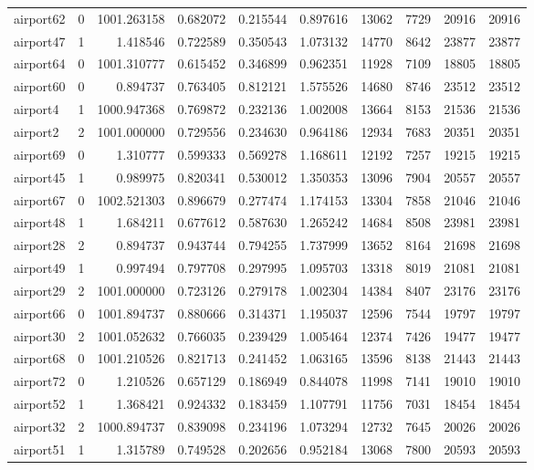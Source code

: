 \begin{longtable}{|l|r|r|r|r|r|r|r|r|r|}
airport62 & 0 & 1001.263158 & 0.682072 & 0.215544 & 0.897616 & 13062 & 7729 & 20916 & 20916 \\
airport47 & 1 & 1.418546 & 0.722589 & 0.350543 & 1.073132 & 14770 & 8642 & 23877 & 23877 \\
airport64 & 0 & 1001.310777 & 0.615452 & 0.346899 & 0.962351 & 11928 & 7109 & 18805 & 18805 \\
airport60 & 0 & 0.894737 & 0.763405 & 0.812121 & 1.575526 & 14680 & 8746 & 23512 & 23512 \\
airport4 & 1 & 1000.947368 & 0.769872 & 0.232136 & 1.002008 & 13664 & 8153 & 21536 & 21536 \\
airport2 & 2 & 1001.000000 & 0.729556 & 0.234630 & 0.964186 & 12934 & 7683 & 20351 & 20351 \\
airport69 & 0 & 1.310777 & 0.599333 & 0.569278 & 1.168611 & 12192 & 7257 & 19215 & 19215 \\
airport45 & 1 & 0.989975 & 0.820341 & 0.530012 & 1.350353 & 13096 & 7904 & 20557 & 20557 \\
airport67 & 0 & 1002.521303 & 0.896679 & 0.277474 & 1.174153 & 13304 & 7858 & 21046 & 21046 \\
airport48 & 1 & 1.684211 & 0.677612 & 0.587630 & 1.265242 & 14684 & 8508 & 23981 & 23981 \\
airport28 & 2 & 0.894737 & 0.943744 & 0.794255 & 1.737999 & 13652 & 8164 & 21698 & 21698 \\
airport49 & 1 & 0.997494 & 0.797708 & 0.297995 & 1.095703 & 13318 & 8019 & 21081 & 21081 \\
airport29 & 2 & 1001.000000 & 0.723126 & 0.279178 & 1.002304 & 14384 & 8407 & 23176 & 23176 \\
airport66 & 0 & 1001.894737 & 0.880666 & 0.314371 & 1.195037 & 12596 & 7544 & 19797 & 19797 \\
airport30 & 2 & 1001.052632 & 0.766035 & 0.239429 & 1.005464 & 12374 & 7426 & 19477 & 19477 \\
airport68 & 0 & 1001.210526 & 0.821713 & 0.241452 & 1.063165 & 13596 & 8138 & 21443 & 21443 \\
airport72 & 0 & 1.210526 & 0.657129 & 0.186949 & 0.844078 & 11998 & 7141 & 19010 & 19010 \\
airport52 & 1 & 1.368421 & 0.924332 & 0.183459 & 1.107791 & 11756 & 7031 & 18454 & 18454 \\
airport32 & 2 & 1000.894737 & 0.839098 & 0.234196 & 1.073294 & 12732 & 7645 & 20026 & 20026 \\
airport51 & 1 & 1.315789 & 0.749528 & 0.202656 & 0.952184 & 13068 & 7800 & 20593 & 20593 \\

\end{longtable}
